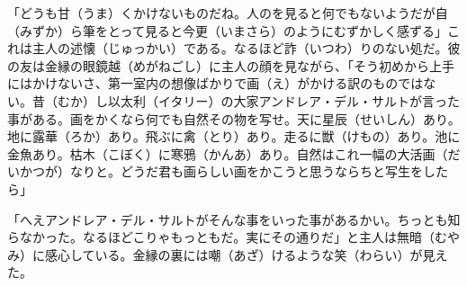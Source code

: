 \documentclass{book}
\begin{document}
「どうも甘（うま）くかけないものだね。人のを見ると何でもないようだが自（みずか）ら筆をとって見ると今更（いまさら）のようにむずかしく感ずる」これは主人の述懐（じゅっかい）である。なるほど詐（いつわ）りのない処だ。彼の友は金縁の眼鏡越（めがねごし）に主人の顔を見ながら、「そう初めから上手にはかけないさ、第一室内の想像ばかりで画（え）がかける訳のものではない。昔（むか）し以太利（イタリー）の大家アンドレア・デル・サルトが言った事がある。画をかくなら何でも自然その物を写せ。天に星辰（せいしん）あり。地に露華（ろか）あり。飛ぶに禽（とり）あり。走るに獣（けもの）あり。池に金魚あり。枯木（こぼく）に寒鴉（かんあ）あり。自然はこれ一幅の大活画（だいかつが）なりと。どうだ君も画らしい画をかこうと思うならちと写生をしたら」

「へえアンドレア・デル・サルトがそんな事をいった事があるかい。ちっとも知らなかった。なるほどこりゃもっともだ。実にその通りだ」と主人は無暗（むやみ）に感心している。金縁の裏には嘲（あざ）けるような笑（わらい）が見えた。
\end{document}
